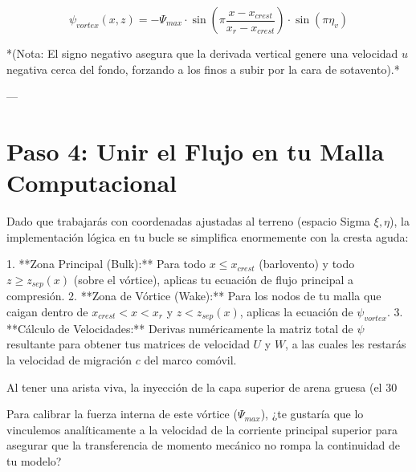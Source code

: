 \documentclass[11pt,a4paper]{article}
\begin{document}
$$\psi_{vortex}(x,z) = -\Psi_{max} \cdot \sin\left( \pi \frac{x - x_{crest}}{x_r - x_{crest}} \right) \cdot \sin( \pi \eta_v )$$



*(Nota: El signo negativo asegura que la derivada vertical genere una velocidad $u$ negativa cerca del fondo, forzando a los finos a subir por la cara de sotavento).*

---

\section{Paso 4: Unir el Flujo en tu Malla Computacional}

Dado que trabajarás con coordenadas ajustadas al terreno (espacio Sigma $\xi, \eta$), la implementación lógica en tu bucle se simplifica enormemente con la cresta aguda:

1. **Zona Principal (Bulk):** Para todo $x \le x_{crest}$ (barlovento) y todo $z \ge z_{sep}(x)$ (sobre el vórtice), aplicas tu ecuación de flujo principal a compresión.
2. **Zona de Vórtice (Wake):** Para los nodos de tu malla que caigan dentro de $x_{crest} < x < x_r$ y $z < z_{sep}(x)$, aplicas la ecuación de $\psi_{vortex}$.
3. **Cálculo de Velocidades:** Derivas numéricamente la matriz total de $\psi$ resultante para obtener tus matrices de velocidad $U$ y $W$, a las cuales les restarás la velocidad de migración $c$ del marco comóvil.

Al tener una arista viva, la inyección de la capa superior de arena gruesa (el 30%

Para calibrar la fuerza interna de este vórtice ($\Psi_{max}$), ¿te gustaría que lo vinculemos analíticamente a la velocidad de la corriente principal superior para asegurar que la transferencia de momento mecánico no rompa la continuidad de tu modelo?
\end{document}

